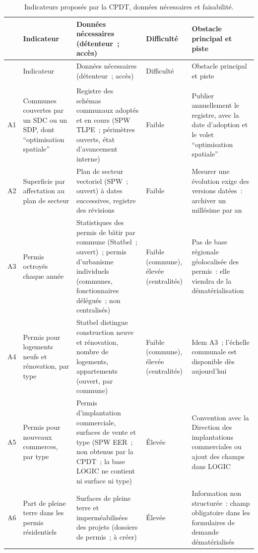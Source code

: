 \documentclass[11pt,a4paper]{report}
\begin{document}
{\scriptsize
\setlength{\tabcolsep}{3pt}
\begin{longtable}{>{\raggedright\arraybackslash}p{0.5cm}>{\raggedright\arraybackslash}p{3.3cm}>{\raggedright\arraybackslash}p{5.3cm}>{\raggedright\arraybackslash}p{1.5cm}>{\raggedright\arraybackslash}p{4.6cm}}
\caption{Indicateurs proposés par la CPDT, données nécessaires et faisabilité.}\label{tab:indicateurs}\\
\toprule
& Indicateur & Données nécessaires (détenteur~; accès) & Difficulté & Obstacle principal et piste \\
\midrule
\endfirsthead
\toprule
& Indicateur & Données nécessaires (détenteur~; accès) & Difficulté & Obstacle principal et piste \\
\midrule
\endhead
\bottomrule
\endfoot
\multicolumn{5}{l}{\textbf{A. Suivi de l'action publique} (non calculés dans la note préparatoire)}\\
A1 & Communes couvertes par un SDC ou un SDP, dont \enquote{optimisation spatiale} & Registre des schémas communaux adoptés et en cours (SPW TLPE~; périmètres ouverts, état d'avancement interne) & Faible & Publier annuellement le registre, avec la date d'adoption et le volet \enquote{optimisation spatiale} \\
A2 & Superficie par affectation au plan de secteur & Plan de secteur vectoriel (SPW~; ouvert) à dates successives, registre des révisions & Faible & Mesurer une évolution exige des versions datées~: archiver un millésime par an \\
A3 & Permis octroyés chaque année & Statistiques des permis de bâtir par commune (Statbel~; ouvert)~; permis d'urbanisme individuels (communes, fonctionnaires délégués~; non centralisés) & Faible (commune), élevée (centralités) & Pas de base régionale géolocalisée des permis~: elle viendra de la dématérialisation \\
A4 & Permis pour logements neufs et rénovation, par type & Statbel distingue construction neuve et rénovation, nombre de logements, appartements (ouvert, par commune) & Faible (commune), élevée (centralités) & Idem A3~; l'échelle communale est disponible dès aujourd'hui \\
A5 & Permis pour nouveaux commerces, par type & Permis d'implantation commerciale, surfaces de vente et type (SPW EER~; non obtenus par la CPDT~; la base LOGIC ne contient ni surface ni type) & Élevée & Convention avec la Direction des implantations commerciales ou ajout des champs dans LOGIC \\
A6 & Part de pleine terre dans les permis résidentiels & Surfaces de pleine terre et imperméabilisées des projets (dossiers de permis~; à créer) & Élevée & Information non structurée~: champ obligatoire dans les formulaires de demande dématérialisés \\

\end{longtable}}
\end{document}
